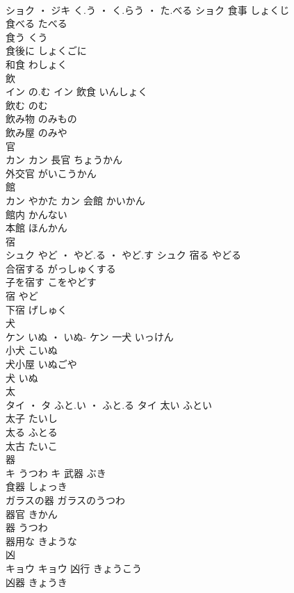 \documentclass[8pt]{extreport}
\begin{document}
\begin{CJK}{UTF8}{min}
\\	ショク ・ ジキ	く.う ・ く.らう ・ た.べる	ショク	食事	しょくじ	
\\	食べる	たべる	
\\	食う	くう	
\\	食後に	しょくごに	
\\	和食	わしょく	
\\	飲	
\\	イン	の.む	イン	飲食	いんしょく	
\\	飲む	のむ	
\\	飲み物	のみもの	
\\	飲み屋	のみや	
\\	官	
\\	カン		カン	長官	ちょうかん	
\\	外交官	がいこうかん	
\\	館	
\\	カン	やかた	カン													会館	かいかん	
\\	館内	かんない	
\\	本館	ほんかん	
\\	宿	
\\	シュク	やど ・ やど.る ・ やど.す	シュク	宿る	やどる	
\\	合宿する	がっしゅくする	
\\	子を宿す	こをやどす	
\\	宿	やど	
\\	下宿	げしゅく	
\\	犬	
\\	ケン	いぬ ・ いぬ-	ケン	一犬	いっけん	
\\	小犬	こいぬ	
\\	犬小屋	いぬごや	
\\	犬	いぬ	
\\	太	
\\	タイ ・ タ	ふと.い ・ ふと.る	タイ	太い	ふとい	
\\	太子	たいし	
\\	太る	ふとる	
\\	太古	たいこ	
\\	器	
\\	キ	うつわ	キ	武器	ぶき	
\\	食器	しょっき	
\\	ガラスの器	ガラスのうつわ	
\\	器官	きかん	
\\	器	うつわ	
\\	器用な	きような	
\\	凶	
\\	キョウ		キョウ	凶行	きょうこう	
\\	凶器	きょうき	

\end{CJK}
\end{document}
